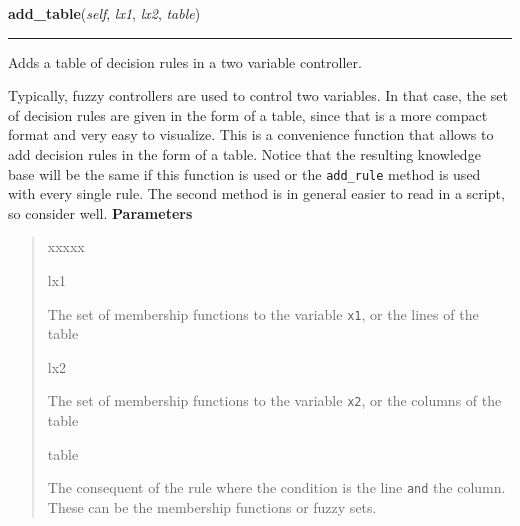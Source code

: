 \hspace{.8\funcindent}\begin{boxedminipage}{\funcwidth}

    \raggedright \textbf{add\_table}(\textit{self}, \textit{lx1}, \textit{lx2}, \textit{table})

    \vspace{-1.5ex}

    \rule{\textwidth}{0.5\fboxrule}
\setlength{\parskip}{2ex}

Adds a table of decision rules in a two variable controller.

Typically, fuzzy controllers are used to control two variables. In that
case, the set of decision rules are given in the form of a table, since
that is a more compact format and very easy to visualize. This is a
convenience function that allows to add decision rules in the form of a
table. Notice that the resulting knowledge base will be the same if this
function is used or the \texttt{add\_rule} method is used with every single
rule. The second method is in general easier to read in a script, so
consider well.
\setlength{\parskip}{1ex}
      \textbf{Parameters}
      \vspace{-1ex}

      \begin{quote}
        \begin{Ventry}{xxxxx}

          \item[lx1]


The set of membership functions to the variable \texttt{x1}, or the
lines of the table
          \item[lx2]


The set of membership functions to the variable \texttt{x2}, or the
columns of the table
          \item[table]


The consequent of the rule where the condition is the line \texttt{and}
the column. These can be the membership functions or fuzzy sets.
        \end{Ventry}

      \end{quote}

    \end{boxedminipage}

    \label{peach:fuzzy:control:Controller:eval}

